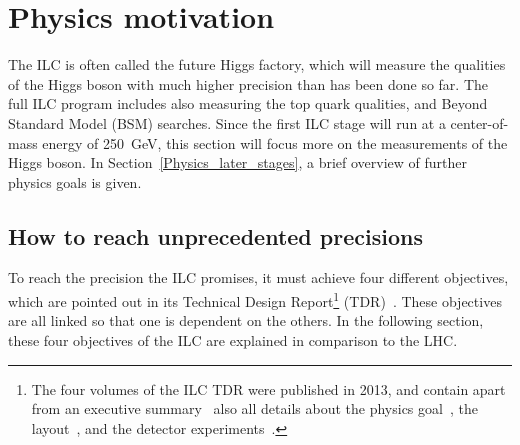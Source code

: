 \section{Physics motivation}
\label{ILC:physicsmotivation}

The ILC is often called the future Higgs factory, which will measure the qualities of the Higgs boson with much higher precision than has been done so far.
The full ILC program includes also measuring the top quark qualities, and Beyond Standard Model (BSM) searches.
Since the first ILC stage will run at a center-of-mass energy of \SI{250}{\GeV}, this section will focus more on the measurements of the Higgs boson.
In Section~\ref{Physics_later_stages}, a brief overview of further physics goals is given.
 
\subsection{How to reach unprecedented precisions}
\label{Physics_Motivation}
To reach the precision the ILC promises, it must achieve four different objectives, which are pointed out in its Technical Design Report\footnote{The four volumes of the ILC TDR were published in 2013, and contain apart from an executive summary~\cite{TDR1} also all details about the physics goal~\cite{TDR2}, the layout~\cite{TDR31,TDR32}, and the detector experiments~\cite{TDR4}.} (TDR)~\cite[p. 2ff]{TDR2}. 
These objectives are all linked so that one is dependent on the others.
In the following section, these four objectives of the ILC are explained in comparison to the LHC.

